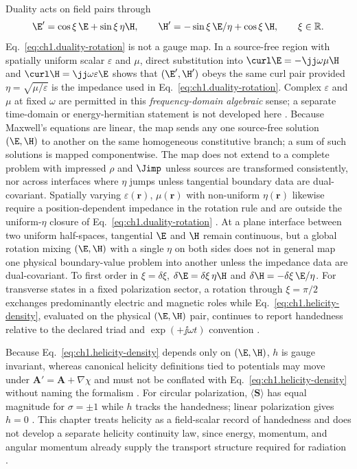 Duality acts on field pairs through
\begin{equation}
\label{eq:ch1.duality-rotation}
\E'=\cos\xi\,\E+\sin\xi\,\eta\H,\qquad
\H'=-\sin\xi\,\E/\eta+\cos\xi\,\H,\qquad \xi\in\mathbb{R}.
\end{equation}
Eq.~\eqref{eq:ch1.duality-rotation} is not a gauge map. In a source-free region with spatially uniform scalar $\varepsilon$ and $\mu$, direct substitution into $\curl\E=-\jj\omega\mu\H$ and $\curl\H=\jj\omega\varepsilon\E$ shows that $(\E',\H')$ obeys the same curl pair provided $\eta=\sqrt{\mu/\varepsilon}$ is the impedance used in Eq.~\eqref{eq:ch1.duality-rotation}. Complex $\varepsilon$ and $\mu$ at fixed $\omega$ are permitted in this \emph{frequency-domain algebraic} sense; a separate time-domain or energy-hermitian statement is not developed here \cite{stratton1941}. Because Maxwell's equations are linear, the map sends any one source-free solution $(\E,\H)$ to another on the same homogeneous constitutive branch; a sum of such solutions is mapped componentwise. The map does not extend to a complete problem with impressed $\rho$ and $\Jimp$ unless sources are transformed consistently, nor across interfaces where $\eta$ jumps unless tangential boundary data are dual-covariant. Spatially varying $\varepsilon(\mathbf r)$, $\mu(\mathbf r)$ with non-uniform $\eta(\mathbf r)$ likewise require a position-dependent impedance in the rotation rule and are outside the uniform-$\eta$ closure of Eq.~\eqref{eq:ch1.duality-rotation} \cite{stratton1941,fernandezcorbaton2013}. At a plane interface between two uniform half-spaces, tangential $\E$ and $\H$ remain continuous, but a global rotation mixing $(\E,\H)$ with a single $\eta$ on both sides does not in general map one physical boundary-value problem into another unless the impedance data are dual-covariant. To first order in $\xi=\delta\xi$, $\delta\E=\delta\xi\,\eta\H$ and $\delta\H=-\delta\xi\,\E/\eta$. For transverse states in a fixed polarization sector, a rotation through $\xi=\pi/2$ exchanges predominantly electric and magnetic roles while Eq.~\eqref{eq:ch1.helicity-density}, evaluated on the physical $(\E,\H)$ pair, continues to report handedness relative to the declared triad and $\exp(+\jj\omega t)$ convention \cite{stratton1941,belinfante1940}.

Because Eq.~\eqref{eq:ch1.helicity-density} depends only on $(\E,\H)$, $h$ is gauge invariant, whereas canonical helicity definitions tied to potentials may move under $\mathbf{A}'=\mathbf{A}+\nabla\chi$ and must not be conflated with Eq.~\eqref{eq:ch1.helicity-density} without naming the formalism \cite{belinfante1940,tai1994,jackson1999}. For circular polarization, $\langle\mathbf{S}\rangle$ has equal magnitude for $\sigma=\pm1$ while $h$ tracks the handedness; linear polarization gives $h=0$ \cite{stratton1941}. This chapter treats helicity as a field-scalar record of handedness and does not develop a separate helicity continuity law, since energy, momentum, and angular momentum already supply the transport structure required for radiation \cite{stratton1941}.


